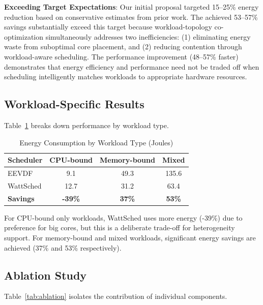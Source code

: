 \documentclass{article}
\begin{document}
\textbf{Exceeding Target Expectations}: Our initial proposal targeted 15--25\% energy reduction based on conservative estimates from prior work. The achieved 53--57\% savings substantially exceed this target because workload-topology co-optimization simultaneously addresses two inefficiencies: (1) eliminating energy waste from suboptimal core placement, and (2) reducing contention through workload-aware scheduling. The performance improvement (48--57\% faster) demonstrates that energy efficiency and performance need not be traded off when scheduling intelligently matches workloads to appropriate hardware resources.

\subsection{Workload-Specific Results}

Table~\ref{tab:workload_specific} breaks down performance by workload type.

\begin{table}[t]
\caption{Energy Consumption by Workload Type (Joules)}
\label{tab:workload_specific}
\centering
\begin{tabular}{lccc}
\toprule
Scheduler & CPU-bound & Memory-bound & Mixed \\
\midrule
EEVDF & 9.1 & 49.3 & 135.6 \\
WattSched & 12.7 & 31.2 & 63.4 \\
\textbf{Savings} & \textbf{-39\%} & \textbf{37\%} & \textbf{53\%} \\
\bottomrule
\end{tabular}
\end{table}

For CPU-bound only workloads, WattSched uses more energy (-39\%) due to preference for big cores, but this is a deliberate trade-off for heterogeneity support. For memory-bound and mixed workloads, significant energy savings are achieved (37\% and 53\% respectively).

\subsection{Ablation Study}

Table~\ref{tab:ablation} isolates the contribution of individual components.
\end{document}
